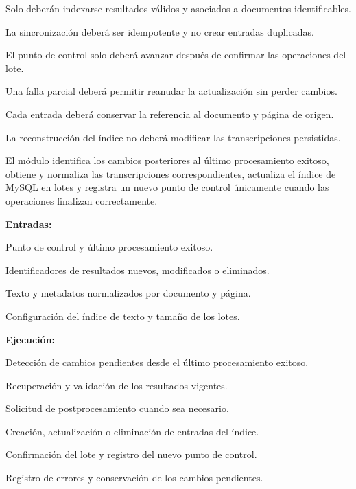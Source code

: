 \begin{definicionmodulo}
\item[Restricciones]
\begin{elementosmodulo}
    \item Solo deberán indexarse resultados válidos y asociados a documentos identificables.
    \item La sincronización deberá ser idempotente y no crear entradas duplicadas.
    \item El punto de control solo deberá avanzar después de confirmar las operaciones del lote.
    \item Una falla parcial deberá permitir reanudar la actualización sin perder cambios.
    \item Cada entrada deberá conservar la referencia al documento y página de origen.
    \item La reconstrucción del índice no deberá modificar las transcripciones persistidas.
\end{elementosmodulo}

\item[Estructura general] El módulo identifica los cambios posteriores al último procesamiento exitoso, obtiene y normaliza las transcripciones correspondientes, actualiza el índice de MySQL en lotes y registra un nuevo punto de control únicamente cuando las operaciones finalizan correctamente.

\textbf{Entradas:}
\begin{elementosmodulo}
    \item Punto de control y último procesamiento exitoso.
    \item Identificadores de resultados nuevos, modificados o eliminados.
    \item Texto y metadatos normalizados por documento y página.
    \item Configuración del índice de texto y tamaño de los lotes.
\end{elementosmodulo}

\textbf{Ejecución:}
\begin{elementosmodulo}
    \item Detección de cambios pendientes desde el último procesamiento exitoso.
    \item Recuperación y validación de los resultados vigentes.
    \item Solicitud de postprocesamiento cuando sea necesario.
    \item Creación, actualización o eliminación de entradas del índice.
    \item Confirmación del lote y registro del nuevo punto de control.
    \item Registro de errores y conservación de los cambios pendientes.
\end{elementosmodulo}


\end{definicionmodulo}
